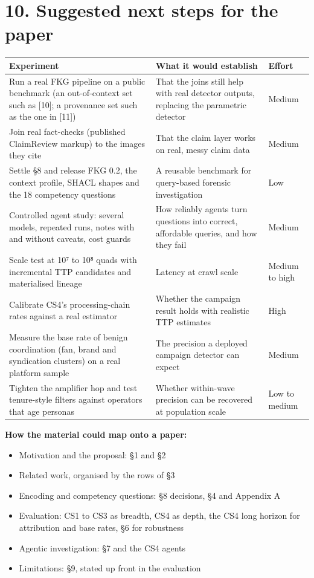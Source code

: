 \documentclass[11pt]{article}
\begin{document}
\section*{10. Suggested next steps for the paper}
\begingroup\small
\begin{xltabular}{\linewidth}{@{}>{\raggedright\arraybackslash{}\hsize}X>{\raggedright\arraybackslash{}\hsize}Xl@{}}
\toprule
\textbf{Experiment} & \textbf{What it would establish} & \textbf{Effort} \\
\midrule
\endhead
Run a real FKG pipeline on a public benchmark (an out-of-context set such as [10]; a provenance set such as the one in [11]) & That the joins still help with real detector outputs, replacing the parametric detector & Medium \\
Join real fact-checks (published ClaimReview markup) to the images they cite & That the claim layer works on real, messy claim data & Medium \\
Settle §8 and release FKG 0.2, the context profile, SHACL shapes and the 18 competency questions & A reusable benchmark for query-based forensic investigation & Low \\
Controlled agent study: several models, repeated runs, notes with and without caveats, cost guards & How reliably agents turn questions into correct, affordable queries, and how they fail & Medium \\
Scale test at 10⁷ to 10⁸ quads with incremental TTP candidates and materialised lineage & Latency at crawl scale & Medium to high \\
Calibrate CS4's processing-chain rates against a real estimator & Whether the campaign result holds with realistic TTP estimates & High \\
Measure the base rate of benign coordination (fan, brand and syndication clusters) on a real platform sample & The precision a deployed campaign detector can expect & Medium \\
Tighten the amplifier hop and test tenure-style filters against operators that age personas & Whether within-wave precision can be recovered at population scale & Low to medium \\
\bottomrule
\end{xltabular}
\endgroup

\textbf{How the material could map onto a paper:}

\begin{itemize}
\item Motivation and the proposal: §1 and §2
\item Related work, organised by the rows of §3
\item Encoding and competency questions: §8 decisions, §4 and Appendix A
\item Evaluation: CS1 to CS3 as breadth, CS4 as depth, the CS4 long horizon for attribution and base rates, §6 for robustness
\item Agentic investigation: §7 and the CS4 agents
\item Limitations: §9, stated up front in the evaluation
\end{itemize}
\end{document}
